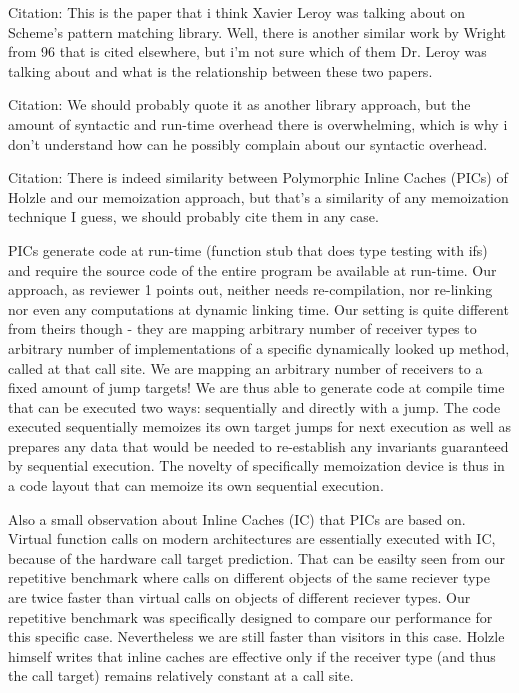 Citation\cite{Tobin-Hochstadt_2010}:
This is the paper that i think Xavier Leroy was talking about on Scheme's 
pattern matching library. Well, there is another similar work by Wright from 96 
that is cited elsewhere, but i'm not sure which of them Dr. Leroy was talking 
about and what is the relationship between these two papers.

Citation\cite{Visser06matchingobjects}:
We should probably quote it as another library approach, but the amount of 
syntactic and run-time overhead there is overwhelming, which is why i don't 
understand how can he possibly complain about our syntactic overhead.

Citation\cite{Holzle:Chambers:Ungar:91}:
There is indeed similarity between Polymorphic Inline Caches (PICs) of Holzle 
and our memoization approach, but that's a similarity of any memoization 
technique I guess, we should probably cite them in any case.

PICs generate code at run-time (function stub that does type testing with ifs) 
and require the source code of the entire program be available at run-time. Our 
approach, as reviewer 1 points out, neither needs re-compilation, nor re-linking 
nor even any computations at dynamic linking time. Our setting is quite 
different from theirs though - they are mapping arbitrary number of receiver 
types to arbitrary number of implementations of a specific dynamically looked up 
method, called at that call site. We are mapping an arbitrary number of 
receivers to a fixed amount of jump targets! We are thus able to generate code 
at compile time that can be executed two ways: sequentially and directly with a 
jump. The code executed sequentially memoizes its own target jumps for next 
execution as well as prepares any data that would be needed to re-establish any 
invariants guaranteed by sequential execution. The novelty of specifically 
memoization device is thus in a code layout that can memoize its own sequential 
execution. 

Also a small observation about Inline Caches (IC) that PICs are based on. 
Virtual function calls on modern architectures are essentially executed with IC, 
because of the hardware call target prediction. That can be easilty seen from 
our repetitive benchmark where calls on different objects of the same reciever 
type are twice faster than virtual calls on objects of different reciever types. 
Our repetitive benchmark was specifically designed to compare our performance 
for this specific case. Nevertheless we are still faster than visitors in this 
case. Holzle himself writes that inline caches are effective only if the 
receiver type (and thus the call target) remains relatively constant at a call 
site. 

